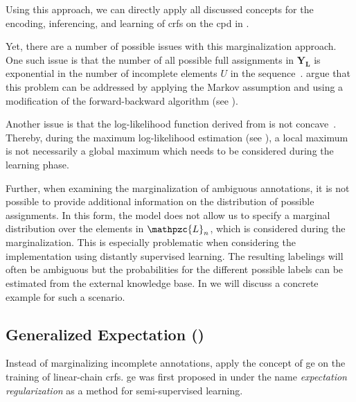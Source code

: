 Using this approach, we can directly apply all discussed concepts for the encoding, inferencing, and learning of \glspl{crf} on the \gls{cpd} in .

\bigskip

Yet, there are a number of possible issues with this marginalization approach.
One such issue is that the number of all possible \glspl{full assignment} in $\mathbf{Y}_{\bm{L}}$ is exponential in the number of incomplete elements $U$ in the sequence~\citep{tsuboi2008training}.
\citet{tsuboi2008training} argue that this problem can be addressed by applying the Markov assumption and using a modification of the forward-backward algorithm (see ).

Another issue is that the log-likelihood function derived from  is not concave~\citep{tsuboi2008training}.
Thereby, during the maximum log-likelihood estimation (see ), a local maximum is not necessarily a global maximum which needs to be considered during the learning phase.

Further, when examining the marginalization of \glspl{ambiguous annotation}, it is not possible to provide additional information on the distribution of possible assignments.
In this form, the model does not allow us to specify a \gls{marginal distribution} over the elements in $\mathpzc{L}_n$, which is considered during the marginalization.
This is especially problematic when considering the implementation using distantly supervised learning.
The resulting labelings will often be ambiguous but the probabilities for the different possible labels can be estimated from the external knowledge base.
In  we will discuss a concrete example for such a scenario.

\subsection{Generalized Expectation ()}\label{subsec:generalized-expectation}

Instead of marginalizing incomplete annotations, \citet{mann2008generalized} apply the concept of \acrfull{ge} on the training of linear-chain \glspl{crf}.
\Gls{ge} was first proposed in \citet{mann2007simple} under the name \textit{expectation regularization} as a method for semi-supervised learning.

